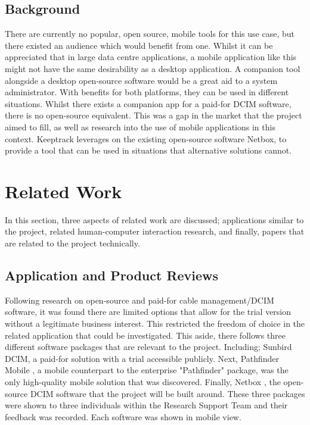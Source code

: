 \documentclass [11pt,a4paper]{article}
\begin{document}
\subsection{Background}
\label{sec:background}

There are currently no popular, open source, mobile tools for this use case, but there existed an audience which would benefit from one. Whilst it can be appreciated that in large data centre applications, a mobile application like this might not have the same desirability as a desktop application. A companion tool alongside a desktop open-source software would be a great aid to a system administrator. With benefits for both platforms, they can be used in different situations. Whilst there exists a companion app for a paid-for DCIM software, there is no open-source equivalent. This was a gap in the market that the project aimed to fill, as well as research into the use of mobile applications in this context. Keeptrack leverages on the existing open-source software Netbox, to provide a tool that can be used in situations that alternative solutions cannot. 

\pagebreak

\section{Related Work}

In this section, three aspects of related work are discussed; applications similar to the project, related human-computer interaction research, and finally, papers that are related to the project technically.

\subsection{Application and Product Reviews}
\label{sec:app_reviews}

Following research on open-source and paid-for cable management/DCIM software, it was found there are limited options that allow for the trial version without a legitimate business interest. This restricted the freedom of choice in the related application that could be investigated. This aside, there follows three different software packages that are relevant to the project. Including; Sunbird DCIM\cite{Sunbird}, a paid-for solution with a trial accessible publicly. Next, Pathfinder Mobile \cite{Pathfinder}, a mobile counterpart to the enterprise "Pathfinder" package, was the only high-quality mobile solution that was discovered. Finally, Netbox \cite{Netbox}, the open-source DCIM software that the project will be built around. These three packages were shown to three individuals within the Research Support Team and their feedback was recorded. Each software was shown in mobile view. 
\end{document}
